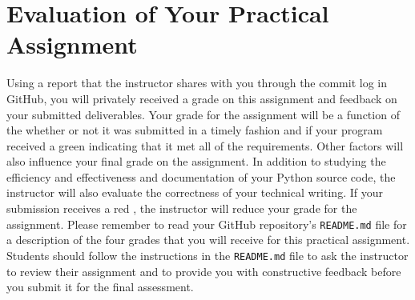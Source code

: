 \documentclass[11pt]{article}
\newcommand{\program}[1]{\lstinline{#1}}
\newcommand{\checkmark}{\ding{51}}
\newcommand{\naughtmark}{\ding{55}}
\begin{document}
\vspace*{-.5em}

\section*{Evaluation of Your Practical Assignment}

Using a report that the instructor shares with you through the commit log in
GitHub, you will privately received a grade on this assignment and feedback on
your submitted deliverables. Your grade for the assignment will be a function of
the whether or not it was submitted in a timely fashion and if your program
received a green \checkmark{} indicating that it met all of the requirements.
Other factors will also influence your final grade on the assignment. In
addition to studying the efficiency and effectiveness and documentation of your
Python source code, the instructor will also evaluate the correctness of your
technical writing. If your submission receives a red \naughtmark{}, the
instructor will reduce your grade for the assignment. Please remember to read
your GitHub repository's \program{README.md} file for a description of the four
grades that you will receive for this practical assignment. Students should
follow the instructions in the \program{README.md} file to ask the instructor to
review their assignment and to provide you with constructive feedback before you
submit it for the final assessment.

\end{document}
